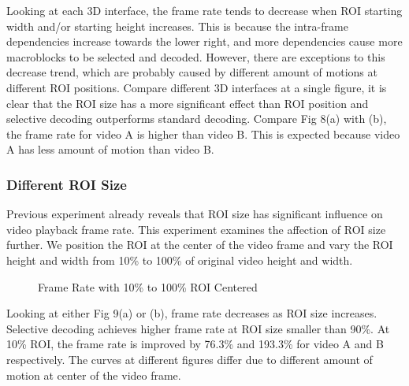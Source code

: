 Looking at each 3D interface, the frame rate tends to decrease when ROI starting width and/or starting height increases. This is because the intra-frame dependencies increase towards the lower right, and more dependencies cause more macroblocks to be selected and decoded. However, there are exceptions to this decrease trend, which are probably caused by different amount of motions at different ROI positions. Compare different 3D interfaces at a single figure, it is clear that the ROI size has a more significant effect than ROI position and selective decoding outperforms standard decoding. Compare Fig 8(a) with (b), the frame rate for video A is higher than video B. This is expected because video A has less amount of motion than video B. 

\subsubsection{Different ROI Size}
Previous experiment already reveals that ROI size has significant influence on video playback frame rate. This experiment examines the affection of ROI size further. We position the ROI at the center of the video frame and vary the ROI height and width from 10\% to 100\% of original video height and width.

\begin{figure}
\centering
\caption{Frame Rate with 10\% to 100\% ROI Centered}
\end{figure} 
Looking at either Fig 9(a) or (b), frame rate decreases as ROI size increases. Selective decoding achieves higher frame rate at ROI size smaller than 90\%. At 10\% ROI, the frame rate is improved by 76.3\% and 193.3\% for video A and B respectively. The curves at different figures differ due to different amount of motion at center of the video frame. 

